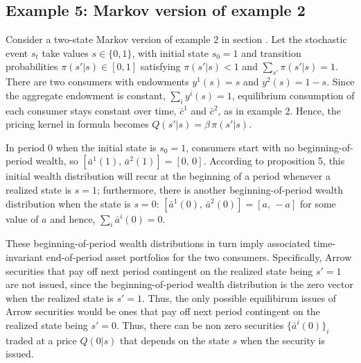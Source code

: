 \subsection{Example 5: Markov version of 
                           example 2}\label{sec:example5}%
Consider a two-state Markov version of example 2 in 
section .
Let the stochastic event $s_t$ take values 
$s\in\{0,1\}$, 
with initial state $s_0=1$ and transition 
probabilities $\pi(s'\vert s)\in [0,1]$
satisfying $\pi(s'|s)<1$ and $\sum_{s'} \pi(s'\vert s)=1$.
There are two consumers with endowments $y^1(s)=s$ and 
$y^2(s)=1-s$. Since the aggregate endowment is constant,
$\sum_i y^i(s)=1$, equilibrium consumption of each
consumer stays constant over time, 
$\bar c^1$ and $\bar c^2$, as in example 2. Hence, 
the pricing kernel in formula  becomes
$Q(s'|s) = \beta \,\pi(s'|s)$.

In period 0 when the initial state is $s_0=1$,  
consumers start with no beginning-of-period wealth, so 
$[\bar a^1(1),\, \bar a^2(1)] = [0,\, 0]$.
According to proposition 5, this initial wealth
distribution will recur  at the beginning of
a period whenever a realized state is $s=1$;  furthermore, 
there is another beginning-of-period wealth
distribution when the state is $s=0$:
$[\bar a^1(0),\, \bar a^2(0)] = [a,\, -\!a]$ 
for some value of $a$ and hence,
$\sum_{i} \bar a^i(0) =0$.

These beginning-of-period wealth distributions in
turn imply associated time-invariant end-of-period 
asset portfolios for  the two consumers. 
Specifically,  Arrow
securities that pay off next period contingent on 
the realized state being $s'=1$ are not  issued, since the 
beginning-of-period wealth distribution is the 
zero vector when the realized state is $s'=1$.
Thus, the only possible equilibirum issues of Arrow
securities would be ones that pay off next period
contingent on the realized state being $s'=0$. Thus, there can be non zero
securities $\{\bar a^i(0)\}_i$ traded  at a price 
$Q(0 | s)$ that depends on the 
state $s$ when the security is issued.

